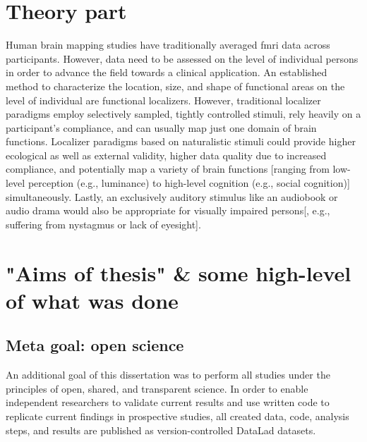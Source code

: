 \section{Theory part}



Human brain mapping studies have traditionally averaged \ac{fmri} data across
participants.
%
However, data need to be assessed on the level of individual persons in order to
advance the field towards a clinical application.
An established method to characterize the location, size, and shape of
functional areas on the level of individual are functional localizers.
However, traditional localizer paradigms employ selectively sampled, tightly
controlled stimuli, rely heavily on a participant's compliance, and can usually
map just one domain of brain functions.
Localizer paradigms based on naturalistic stimuli could provide higher
ecological as well as external validity, higher data quality due to increased
compliance, and potentially map a variety of brain functions [ranging from
low-level perception (e.g., luminance) to high-level cognition (e.g., social
cognition)] simultaneously.
Lastly, an exclusively auditory stimulus like an audiobook or audio drama would
also be appropriate for visually impaired persons[, e.g., suffering from
nystagmus or lack of eyesight].


\section{"Aims of thesis" \& some high-level of what was done}



\subsection{Meta goal: open science}

An additional goal of this dissertation was to perform all studies under the
principles of open, shared, and transparent science.
%
In order to enable independent researchers to validate current results and use
written code to replicate current findings in prospective studies, all created
data, code, analysis steps, and results are published as version-controlled
DataLad \citep[\href{www.datalad.org}{datalad.org};][]{halchenko2021datalad}
datasets.



